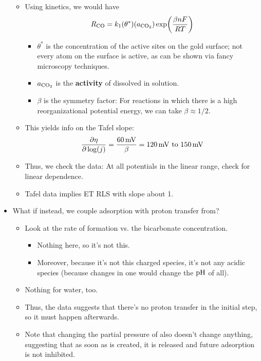 \documentclass[../notes.tex]{subfiles}
\begin{document}
\begin{itemize}
\begin{itemize}
        \item Using kinetics, we would have
        \begin{equation*}
            R_{\ce{CO}} = k_1(\theta^*)(a_{\ce{CO2}})\exp(\frac{\beta nF}{RT})
        \end{equation*}
        \begin{itemize}
            \item $\theta^*$ is the concentration of the active sites on the gold surface; not every atom on the surface is active, as can be shown via fancy microscopy techniques.
            \item $a_{\ce{CO2}}$ is the \textbf{activity} of  dissolved in solution.
            \item $\beta$ is the symmetry factor: For reactions in which there is a high reorganizational potential energy, we can take $\beta\approx 1/2$.
        \end{itemize}
        \item This yields info on the Tafel slope:
        \begin{equation*}
            \pdv{\eta}{\log(j)} = \frac{\SI{60}{\milli\volt}}{\beta}
            = \SIrange{120}{150}{\milli\volt}
        \end{equation*}
        \item Thus, we check the data: At all potentials in the linear range, check for linear dependence.
        \item Tafel data implies ET RLS with slope about 1.
    \end{itemize}
    \item What if instead, we couple adsorption with proton transfer from?
    \begin{itemize}
        \item Look at the rate of  formation vs. the bicarbonate concentration.
        \begin{itemize}
            \item Nothing here, so it's not this.
            \item Moreover, because it's not this charged species, it's not any acidic species (because changes in one would change the $\operatorname{pH}$ of all).
        \end{itemize}
        \item Nothing for water, too.
        \item Thus, the data suggests that there's no proton transfer in the initial step, so it must happen afterwards.
        \item Note that changing the partial pressure of  also doesn't change anything, suggesting that as soon as  is created, it is released and future adsorption is not inhibited.

\end{itemize}
\end{itemize}
\end{document}
